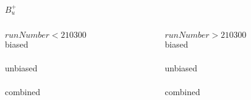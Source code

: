 \begin{frame}{$B_u^+$}
  
  \begin{columns}
  
    \begin{column}{0.45\textwidth}
      $runNumber<210300$\\[3mm]
      {biased} \\[2mm]
      \resizebox{\textwidth}{!}{}\\[5mm]
      {unbiased} \\[2mm]
      \resizebox{\textwidth}{!}{}\\[5mm]
      {combined} \\[2mm]
      \resizebox{\textwidth}{!}{}\\
    \end{column}
  
    \begin{column}{0.45\textwidth}
      $runNumber>210300$\\[3mm]
      {biased} \\[2mm]
      \resizebox{\textwidth}{!}{}\\[5mm]
      {unbiased} \\[2mm]
      \resizebox{\textwidth}{!}{}\\[5mm]
      {combined} \\[2mm]
      \resizebox{\textwidth}{!}{}\\
    \end{column}
  
  \end{columns}

\end{frame}



